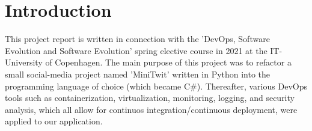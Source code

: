 \section{Introduction}
This project report is written in connection with the 'DevOps, Software Evolution and Software Evolution' spring elective course in 2021 at the IT-University of Copenhagen. The main purpose of this project was to refactor a small social-media project named 'MiniTwit' written in Python into the programming language of choice (which became C\#). Thereafter, various DevOps tools such as containerization, virtualization, monitoring, logging, and security analysis,  which all allow for continuos integration/continuous deployment, were applied to our application.